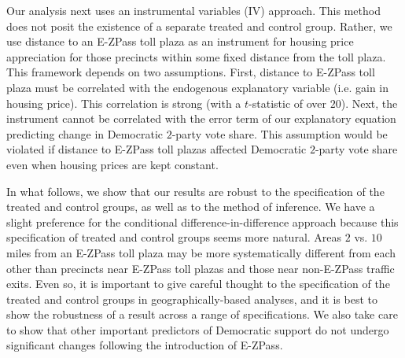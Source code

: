 Our analysis next uses an instrumental variables (IV) approach. This method does not posit the existence of a separate treated and control group. Rather, we use distance to an E-ZPass toll plaza as an instrument for housing price appreciation for those precincts within some fixed distance from the toll plaza. This framework depends on two assumptions. First, distance to E-ZPass toll plaza must be correlated with the endogenous explanatory variable (i.e. gain in housing price). This correlation is strong (with a $t$-statistic of over $20$). Next, the instrument cannot be correlated with the error term of our explanatory equation predicting change in Democratic $2$-party vote share. This assumption would be violated if distance to E-ZPass toll plazas affected Democratic $2$-party vote share even when housing prices are kept constant. 

In what follows, we show that our results are robust to the specification of the treated and control groups, as well as to the method of inference. We have a slight preference for the conditional difference-in-difference approach because this specification of treated and control groups seems more natural. Areas $2$ vs. $10$ miles from an E-ZPass toll plaza may be more systematically different from each other than precincts near E-ZPass toll plazas and those near non-E-ZPass traffic exits. Even so, it is important to give careful thought to the specification of the treated and control groups in geographically-based analyses, and it is best to show the robustness of a result across a range of specifications.  We also take care to show that other important predictors of Democratic support do not undergo significant changes following the introduction of E-ZPass. 